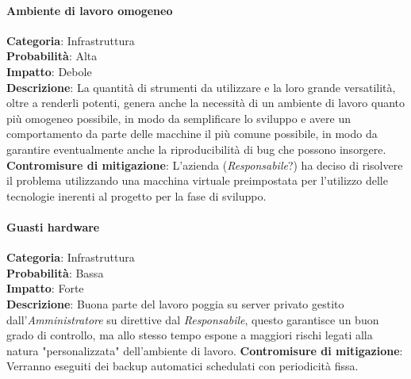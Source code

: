 \documentclass{scalatekids-article}
\begin{document}
\paragraph{Ambiente di lavoro omogeneo}
\textbf{Categoria}: Infrastruttura\\
\textbf{Probabilità}: Alta\\
\textbf{Impatto}: Debole\\
\textbf{Descrizione}: La quantità di strumenti da utilizzare e la loro grande versatilità, oltre a renderli potenti, genera anche
la necessità di un ambiente di lavoro quanto più omogeneo possibile, in modo da semplificare lo sviluppo e avere un comportamento
da parte delle macchine il più comune possibile, in modo da garantire eventualmente anche la riproducibilità di bug che possono
insorgere.
\textbf{Contromisure di mitigazione}: L'azienda (\textit{Responsabile}?) ha deciso di risolvere il problema utilizzando una macchina virtuale
preimpostata per l'utilizzo delle tecnologie inerenti al progetto per la fase di sviluppo.
\paragraph{Guasti hardware}
\textbf{Categoria}: Infrastruttura\\
\textbf{Probabilità}: Bassa\\
\textbf{Impatto}: Forte\\
\textbf{Descrizione}: Buona parte del lavoro poggia su server privato gestito dall'\textit{Amministratore} su direttive dal \textit{Responsabile},
questo garantisce un buon grado di controllo, ma allo stesso tempo espone a maggiori rischi legati alla natura "personalizzata" dell'ambiente di lavoro.
\textbf{Contromisure di mitigazione}: Verranno eseguiti dei backup automatici schedulati con periodicità fissa.
\end{document}

